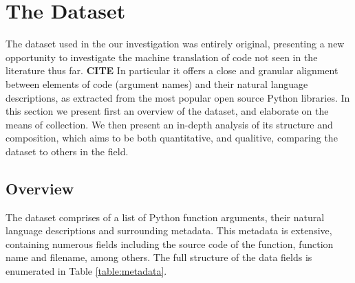 \chapter{The Dataset}
\label{the_dataset}



The dataset used in the our investigation was entirely original, presenting a new opportunity to investigate the machine translation of code not seen in the literature thus far. \textbf{CITE}
In particular it offers a close and granular alignment between elements of code (argument names) and their natural language descriptions, as extracted from the most popular open source Python libraries.
In this section we present first an overview of the dataset, and elaborate on  the means of collection. 
We then present an in-depth analysis of its structure and composition, which aims to be both quantitative, and qualitive, comparing the dataset to others in the field. 

\section{Overview} %
\label{sec:overview}

The dataset comprises of a list of Python function arguments, their natural language descriptions and surrounding metadata. 
This metadata is extensive, containing numerous fields including the source code of the function, function name and filename, among others. 
The full structure of the data fields is enumerated in Table \ref{table:metadata}. 

